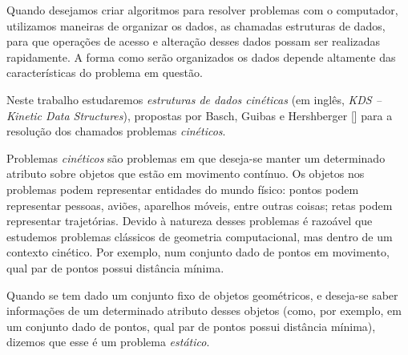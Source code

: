 

\label{cap:introducao}

\enlargethispage{.5\baselineskip}

Quando desejamos criar algoritmos para resolver problemas com o computador,
utilizamos maneiras de organizar os dados, as chamadas estruturas de dados,
para que operações de acesso e alteração desses dados possam ser realizadas
rapidamente.
A forma como serão organizados os dados depende altamente das características do
problema em questão.

Neste trabalho estudaremos \textit{estruturas de dados cinéticas} (em inglês,
\emph{KDS -- Kinetic Data Structures}), propostas por Basch, Guibas e Hershberger
[\cite{BASCH19991}] para a resolução dos chamados problemas \textit{cinéticos}.

Problemas \textit{cinéticos} são problemas em que deseja-se manter um
determinado atributo sobre objetos que estão em movimento contínuo.
Os objetos nos problemas podem representar entidades do mundo físico: pontos podem
representar pessoas, aviões, aparelhos móveis, entre outras coisas;
retas podem representar trajetórias.
Devido à natureza desses problemas é razoável que estudemos problemas clássicos de
geometria computacional, mas dentro de um contexto cinético.
Por exemplo, num conjunto dado de pontos em movimento, qual par de pontos possui
distância mínima.

Quando se tem dado um conjunto fixo de objetos geométricos, e deseja-se saber
informações de um determinado atributo desses objetos (como, por exemplo, em um
conjunto dado de pontos, qual par de pontos possui distância mínima), dizemos
que esse é um problema \textit{estático}.

